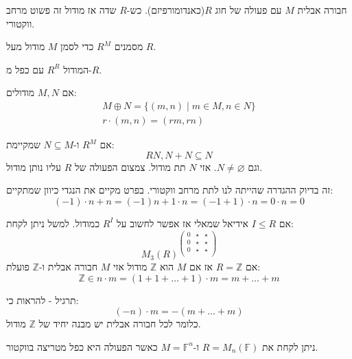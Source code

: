 \documentclass{tstextbook}
\begin{document}
\begin{reminder}[מודל]
חבורה אבלית \(M\) עם פעולה של חוג \(R\)(כאנדומורפיזם).
כש-\(R\) שדה אז מודול זה פשוט מרחב ווקטורי.

\end{reminder}
\begin{symbolize}
מסמנים \(R^{M}\) כדי לסמן \(M\) מודול מעל \(R\).

\end{symbolize}
\begin{example}
המודול \(R^{R}\) עם כפל מ-\(R\).

\end{example}
\begin{example}
אם \(M,N\) מודולים:
\begin{gather*}M\oplus N=\{ (m,n)\mid m \in M, n \in N \} \\r\cdot(m,n)=(r m, rn)
\end{gather*}

\end{example}
\begin{definition}[תת מודול]
אם \(R^{M}\) ו-\(N\subseteq M\) שמקיימת:
$$RN, N+N\subseteq N$$
וגם \(N\neq \varnothing\). אזי \(N\) תת מודול. צמצום הפעולה של \(R\) עליו נותן מודול.

\end{definition}
\begin{remark}
זה בדיוק ההגדרה שהייתה לנו לתת מרחב ווקטורי. בפרט מקיים את הנגדי כיוון שמתקיים:
$$(-1)\cdot n+n=(-1)n+1\cdot n=(-1+1)\cdot n=0\cdot n=0$$

\end{remark}
אם \(I\leq R\) אידיאל שמאלי אז אפשר לחשוב על \(R^{I}\) כמודול. למשל ניתן לקחת:
$$M_{3}(R)^{\begin{pmatrix}0& \star &\star\\0& \star &\star\\0& \star &\star\\
\end{pmatrix}}$$
אם \(R=\mathbb{Z}\) אז אם \(M\) הוא \(\mathbb{Z}\) מודול אזי \(M\) חבורה אבלית ו-\(\mathbb{Z}\) פועלת:
$$\mathbb{Z} \in n\cdot m =(1+1+\dots+1)\cdot m=m+\dots+m$$

תרגיל - להראות כי:
$$(-n)\cdot m=-(m+\dots+m)$$
כלומר לכל חבורה אבלית יש מבנה יחיד של \(\mathbb{Z}\) מודול.

ניתן לקחת את \(R=M_{n}(\mathbb{F})\) ו-\(M=\mathbb{F}^{n}\) כאשר הפעולה היא כפל מטריצה בווקטור.
\end{document}
